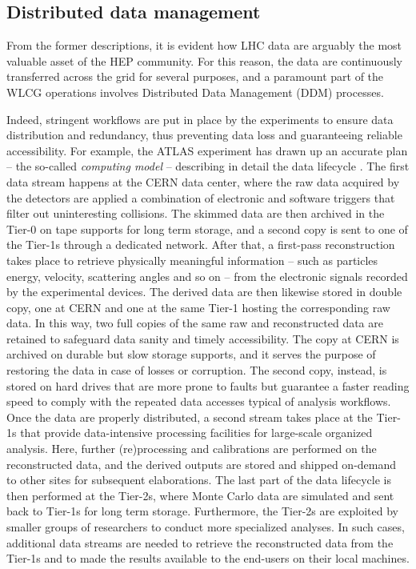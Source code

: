 \subsection{Distributed data management}
\label{ddm}

From the former descriptions, it is evident how LHC data are arguably the most valuable asset of the HEP community.
For this reason, the data are continuously transferred across the grid for several purposes, and a paramount part of the WLCG operations involves Distributed Data Management (DDM) processes.

Indeed, stringent workflows are put in place by the experiments to ensure data distribution and redundancy, thus preventing data loss and guaranteeing reliable accessibility.
For example, the ATLAS experiment has drawn up an accurate plan -- the so-called \textit{computing model} -- describing in detail the data lifecycle \cite{aad2008atlas, calafiura2020design_report, bird2011computing}.
The first data stream happens at the CERN data center, where the raw data acquired by the detectors are applied a combination of electronic and software triggers that filter out uninteresting collisions.
The skimmed data are then archived in the Tier-0 on tape supports for long term storage, and a second copy is sent to one of the Tier-1s through a dedicated network. 
After that, a first-pass reconstruction takes place to retrieve physically meaningful information -- such as particles energy, velocity, scattering angles and so on  -- from the electronic signals recorded by the experimental devices.
The derived data are then likewise stored in double copy, one at CERN and one at the same Tier-1 hosting the corresponding raw data.
In this way, two full copies of the same raw and reconstructed data are retained to safeguard data sanity and timely accessibility.
The copy at CERN is archived on durable but slow storage supports, and it serves the purpose of restoring the data in case of losses or corruption. The second copy, instead, is stored on hard drives that are more prone to faults but guarantee a faster reading speed to comply with the repeated data accesses typical of analysis workflows.
Once the data are properly distributed, a second stream takes place at the Tier-1s that provide data-intensive processing facilities for large-scale organized analysis. Here, further (re)processing and calibrations are performed on the reconstructed data, and the derived outputs are stored and shipped on-demand to other sites for subsequent elaborations.
The last part of the data lifecycle is then performed at the Tier-2s, where Monte Carlo data are simulated and sent back to Tier-1s for long term storage. 
Furthermore, the Tier-2s are exploited by smaller groups of researchers to conduct more specialized analyses. In such cases, additional data streams are needed to retrieve the reconstructed data from the Tier-1s and to made the results available to the end-users on their local machines.

